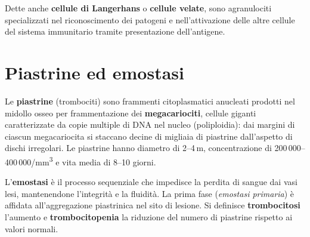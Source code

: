 Dette anche \textbf{cellule di Langerhans} o \textbf{cellule velate}, sono
agranulociti specializzati nel riconoscimento dei patogeni e
nell'attivazione delle altre cellule del sistema immunitario tramite
presentazione dell'antigene.

\section{Piastrine ed emostasi}

Le \textbf{piastrine} (trombociti) sono frammenti citoplasmatici anucleati
prodotti nel midollo osseo per frammentazione dei \textbf{megacariociti},
cellule giganti caratterizzate da copie multiple di DNA nel nucleo
(poliploidia): dai margini di ciascun megacariocita si staccano decine di
migliaia di piastrine dall'aspetto di dischi irregolari. Le piastrine hanno
diametro di 2--4\,\textmu m, concentrazione di
200\,000--400\,000/mm\textsuperscript{3} e vita media di 8--10 giorni.

L'\textbf{emostasi} è il processo sequenziale che impedisce la perdita di
sangue dai vasi lesi, mantenendone l'integrità e la fluidità. La prima fase
(\textit{emostasi primaria}) è affidata all'aggregazione piastrinica nel sito
di lesione. Si definisce \textbf{trombocitosi} l'aumento e
\textbf{trombocitopenia} la riduzione del numero di piastrine rispetto ai
valori normali.
